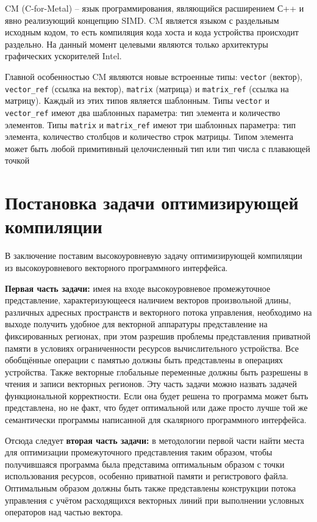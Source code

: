 CM (C-for-Metal) \cite{lueh2021c} -- язык программирования, являющийся расширением С++ и явно реализующий концепцию SIMD. CM является языком с раздельным исходным кодом, то есть компиляция кода хоста и кода устройства происходит раздельно. На данный момент целевыми являются только архитектуры графических ускорителей Intel.

Главной особенностью CM являются новые встроенные типы: \texttt{vector} (вектор), \texttt{vector\_ref} (ссылка на вектор), \texttt{matrix} (матрица) и \texttt{matrix\_ref} (ссылка на матрицу). Каждый из этих типов является шаблонным. Типы \texttt{vector} и \texttt{vector\_ref} имеют два шаблонных параметра: тип элемента и количество элементов. Типы \texttt{matrix} и \texttt{matrix\_ref} имеют три шаблонных
параметра: тип элемента, количество столбцов и количество строк матрицы. Типом элемента может быть любой примитивный целочисленный тип или тип числа с плавающей точкой

\section{Постановка задачи оптимизирующей компиляции}\label{sec:overview/howtobetter}

В заключение поставим высокоуровневую задачу оптимизирующей компиляции из высокоуровневого векторного программного интерфейса.

\textbf{Первая часть задачи:} имея на входе высокоуровневое промежуточное представление, характеризующееся наличием векторов произвольной длины, различных адресных пространств и векторного потока управления, необходимо на выходе получить удобное для векторной аппаратуры представление на фиксированных регионах, при этом разрешив проблемы представления приватной памяти в условиях ограниченности ресурсов вычислительного устройства. Все обобщённые операции с памятью должны быть представлены в операциях устройства. Также векторные глобальные переменные должны быть разрешены в чтения и записи векторных регионов. Эту часть задачи можно назвать задачей функциональной корректности. Если она будет решена то программа может быть представлена, но не факт, что будет оптимальной или даже просто лучше той же семантически программы написанной для скалярного программного интерфейса.

Отсюда следует \textbf{вторая часть задачи:} в методологии первой части найти места для оптимизации промежуточного представления таким образом, чтобы получившаяся программа была представима оптимальным образом с точки использования ресурсов, особенно приватной памяти и регистрового файла. Оптимальным образом должны быть также представлены конструкции потока управления с учётом расходящихся векторных линий при выполнении условных операторов над частью вектора.

